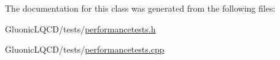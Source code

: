 The documentation for this class was generated from the following files\+:\begin{DoxyCompactItemize}
\item 
Gluonic\+L\+Q\+C\+D/tests/\mbox{\hyperlink{performancetests_8h}{performancetests.\+h}}\item 
Gluonic\+L\+Q\+C\+D/tests/\mbox{\hyperlink{performancetests_8cpp}{performancetests.\+cpp}}\end{DoxyCompactItemize}
